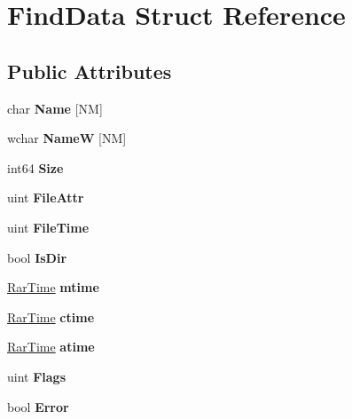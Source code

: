 \hypertarget{struct_find_data}{\section{Find\-Data Struct Reference}
\label{struct_find_data}
}
\subsection*{Public Attributes}
\begin{DoxyCompactItemize}
\item 
\hypertarget{struct_find_data_a20a349722b3f4c321a41c899b98ff92f}{char {\bfseries Name} \mbox{[}N\-M\mbox{]}}\label{struct_find_data_a20a349722b3f4c321a41c899b98ff92f}

\item 
\hypertarget{struct_find_data_a4d8b96033d8330b18fcb59929d81ef0a}{wchar {\bfseries Name\-W} \mbox{[}N\-M\mbox{]}}\label{struct_find_data_a4d8b96033d8330b18fcb59929d81ef0a}

\item 
\hypertarget{struct_find_data_a30f5982c4998f7d5dea652c4d3b29c39}{int64 {\bfseries Size}}\label{struct_find_data_a30f5982c4998f7d5dea652c4d3b29c39}

\item 
\hypertarget{struct_find_data_a8cf6201242e2bdb3743a968e9e221e1c}{uint {\bfseries File\-Attr}}\label{struct_find_data_a8cf6201242e2bdb3743a968e9e221e1c}

\item 
\hypertarget{struct_find_data_a592644ce87bdeba34a42b166f6e56cb3}{uint {\bfseries File\-Time}}\label{struct_find_data_a592644ce87bdeba34a42b166f6e56cb3}

\item 
\hypertarget{struct_find_data_af294fda4d711e5808fbfb87d3af95462}{bool {\bfseries Is\-Dir}}\label{struct_find_data_af294fda4d711e5808fbfb87d3af95462}

\item 
\hypertarget{struct_find_data_a0d6c787fcfe10839a7efb8a62425a6c2}{\hyperlink{class_rar_time}{Rar\-Time} {\bfseries mtime}}\label{struct_find_data_a0d6c787fcfe10839a7efb8a62425a6c2}

\item 
\hypertarget{struct_find_data_aea792dfa4b64278dc42c9a0a1a6b409b}{\hyperlink{class_rar_time}{Rar\-Time} {\bfseries ctime}}\label{struct_find_data_aea792dfa4b64278dc42c9a0a1a6b409b}

\item 
\hypertarget{struct_find_data_a052bd174bb0702bf987cc24916802b51}{\hyperlink{class_rar_time}{Rar\-Time} {\bfseries atime}}\label{struct_find_data_a052bd174bb0702bf987cc24916802b51}

\item 
\hypertarget{struct_find_data_a75c29a8fe2f236f688c98b877c67bac2}{uint {\bfseries Flags}}\label{struct_find_data_a75c29a8fe2f236f688c98b877c67bac2}

\item 
\hypertarget{struct_find_data_ab891d3e368f9c03b16a685c13279ad96}{bool {\bfseries Error}}\label{struct_find_data_ab891d3e368f9c03b16a685c13279ad96}

\end{DoxyCompactItemize}


